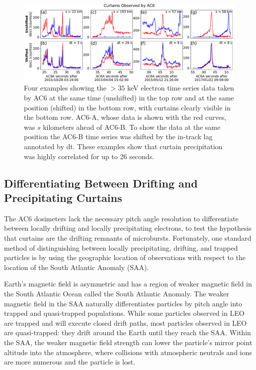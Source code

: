 \documentclass[draft]{agujournal2019}
\begin{document}
\begin{figure}
\includegraphics[width=\textwidth]{fig1.pdf}
\caption{Four examples showing the $>35$ keV electron time series data taken by AC6 at the same time (unshifted) in the top row and at the same position (shifted) in the bottom row, with curtains clearly visible in the bottom row. AC6-A, whose data is shown with the red curves, was $s$ kilometers ahead of AC6-B. To show the data at the same position the AC6-B time series was shifted by the in-track lag annotated by dt. These examples show that curtain precipitation was highly correlated for up to 26 seconds.}
\label{fig1}
\end{figure}

\subsection{Differentiating Between Drifting and Precipitating Curtains} \label{blc_methodology}

The AC6 dosimeters lack the necessary pitch angle resolution to differentiate between locally drifting and locally precipitating electrons, to test the  hypothesis that curtains are the drifting remnants of microbursts. Fortunately, one standard method of distinguishing between locally precipitating, drifting, and trapped particles is by using the geographic location of observations with respect to the location of the South Atlantic Anomaly (SAA).

Earth's magnetic field is asymmetric and has a region of weaker magnetic field in the South Atlantic Ocean called the South Atlantic Anomaly. The weaker magnetic field in the SAA naturally differentiates particles by pitch angle into trapped and quasi-trapped populations. While some particles observed in LEO are trapped and will execute closed drift paths, most particles observed in LEO are quasi-trapped: they drift around the Earth until they reach the SAA. Within the SAA, the weaker magnetic field strength can lower the particle's mirror point altitude into the atmosphere, where collisions with atmospheric neutrals and ions are more numerous and the particle is lost. 
\end{document}
